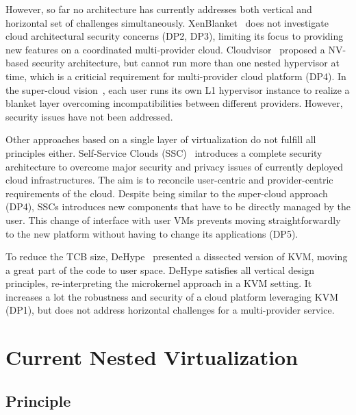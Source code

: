 \documentclass{sig-alternate}
\begin{document}
However, so far no architecture has currently addresses both vertical and horizontal set of challenges simultaneously. XenBlanket~\cite{art:blan} does not investigate cloud architectural security concerns (DP2, DP3), limiting its focus to providing new features on a coordinated multi-provider cloud. Cloudvisor~\cite{cloudvisor:zhang} proposed a NV-based security architecture, but cannot run more than one nested hypervisor at time, which is a criticial requirement for multi-provider cloud platform (DP4). In the super-cloud vision~\cite{xclo:blank}, each user runs its own L1 hypervisor instance to realize  a blanket layer overcoming incompatibilities between different providers. However, security issues have not been addressed.

Other approaches based on a single layer of virtualization do not fulfill all principles either. Self-Service Clouds (SSC)~\cite{ssc:art} introduces a complete security architecture to overcome major security and privacy issues of currently deployed cloud infrastructures. The aim is to reconcile user-centric and provider-centric requirements of the cloud. Despite being similar to the super-cloud approach (DP4), SSCs introduces new components that have to be directly managed by the user. This change of interface with user VMs prevents moving straightforwardly to the new platform without having to change its  applications (DP5).

To reduce the TCB size, DeHype~\cite{wu2013TamHosHypMosDepExe} presented a dissected version of KVM, moving a great part of the code to user space. DeHype satisfies all vertical design principles, re-interpreting the microkernel approach in a KVM setting. It increases a lot the robustness and security of a cloud platform leveraging KVM (DP1), but does not address horizontal challenges for a multi-provider service.

\section{Current Nested Virtualization}
\label{sec:classic}

\subsection{Principle}
\end{document}
